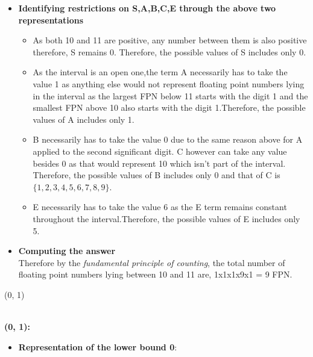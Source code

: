 \documentclass[letterpaper]{exam}
\begin{document}
\begin{questions}
\begin{parts}
\begin{subparts}
\begin{solution}
\begin{itemize}
\begin{itemize}
\item A is 1 as it is the first digit(digit before the decimal point) in scientific notation.
\item B is 1 and C is 0 as they're the first two significant digits that trail the decimal point.
\item E is 6 as the exponent in scientific notation is 1. Adding the bias 5 to the exponent value, we get the value of E to be 6.
\end{itemize}
\item \textbf{Identifying restrictions on S,A,B,C,E through the above two representations}\\
\begin{itemize}
    \item As both 10 and 11 are positive, any number between them is also positive therefore, S remains 0. Therefore, the possible values of S includes only 0.
    \item As the interval is an open one,the term A necessarily has to take the value 1 as anything else would not represent floating point numbers lying in the interval as the largest FPN below 11 starts with the digit 1 and the smallest FPN above 10 also starts with the digit 1.Therefore, the possible values of A includes only 1.
    \item B necessarily has to take the value 0 due to the same reason above for A applied to the second significant digit. C however can take any value besides 0 as that would represent 10 which isn't part of the interval. Therefore, the possible values of B includes only 0 and that of C is $\{1,2,3,4,5,6,7,8,9\}$.
    \item E necessarily has to take the value 6 as the E term remains constant throughout the interval.Therefore, the possible values of E includes only 5.
\end{itemize}
\item \textbf{Computing the answer}\\
Therefore by the \textit{fundamental principle of counting}, the total number of floating point numbers lying between 10 and 11 are, 1x1x1x9x1 = 9 FPN.
	\end{itemize}
	\end{solution}
	\subpart (0, 1)
	\begin{solution}
	\\
	\textbf{(0, 1):}
	\begin{itemize}
	    \item \textbf{Representation of the lower bound 0}:\\

\end{itemize}
\end{solution}
\end{subparts}
\end{parts}
\end{questions}
\end{document}
